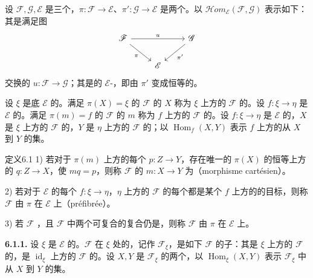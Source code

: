 设 $\mathscr F,\mathscr G,\mathscr E$ 是三个，$\pi:\mathscr F\to\mathscr E$、$\pi':\mathscr G\to\mathscr E$ 是两个。以 $\mathscr{H}\!om_{\mathscr E}(\mathscr F,\mathscr G)$ 表示如下：其是满足图
\[
\begin{tikzcd}
\mathscr F\arrow[rr,"u"]\arrow[dr,"\pi"']&&\mathscr G\arrow[dl,"\pi'"]\\
&\mathscr E&
\end{tikzcd}
\]
交换的 $u:\mathscr F\to\mathscr G$；其是的 $\mathscr E$-，即由 $\pi'$ 变成恒等的。

设 $\xi$ 是底 $\mathscr E$ 的。满足 $\pi(X)=\xi$ 的 $\mathscr F$ 的 $X$ 称为 $\xi$ 上方的 $\mathscr F$ 的。设 $f:\xi\to\eta$ 是 $\mathscr E$ 的。满足 $\pi(m)=f$ 的 $\mathscr F$ 的 $m$ 称为 $f$ 上方的 $\mathscr F$ 的。设 $f:\xi\to\eta$ 是 $\mathscr E$ 的，$X$ 是 $\xi$ 上方的 $\mathscr F$ 的，$Y$ 是 $\eta$ 上方的 $\mathscr F$ 的；以 $\operatorname{Hom}_f(X,Y)$ 表示 $f$ 上方的从 $X$ 到 $Y$ 的集。

\begin{SGAresult}{定义}{6.1}
1) 若对于 $\pi(m)$ 上方的每个 $p:Z\to Y$，存在唯一的 $\pi(X)$ 的恒等上方的 $q:Z\to X$，使 $mq=p$，则称 $\mathscr F$ 的 $m:X\to Y$ 为（morphisme cartésien）。

2) 若对于 $\mathscr E$ 的每个 $f:\xi\to\eta$，$\eta$ 上方的 $\mathscr F$ 的每个都是某个 $f$ 上方的的目标，则称 $\mathscr F$ 由 $\pi$ 在 $\mathscr E$ 上（préfibrée）。

3) 若 $\mathscr F$ ，且 $\mathscr F$ 中两个可复合的复合仍是，则称 $\mathscr F$ 由 $\pi$ 在 $\mathscr E$ 上。
\end{SGAresult}

\textbf{6.1.1.} 设 $\xi$ 是 $\mathscr E$ 的。$\mathscr F$ 在 $\xi$ 处的，记作 $\mathscr F_\xi$，是如下 $\mathscr F$ 的子：其是 $\xi$ 上方的 $\mathscr F$ 的，是 $\operatorname{id}_\xi$ 上方的 $\mathscr F$ 的。设 $X,Y$ 是 $\mathscr F_\xi$ 的两个，以 $\operatorname{Hom}_\xi(X,Y)$ 表示 $\mathscr F_\xi$ 中从 $X$ 到 $Y$ 的集。

